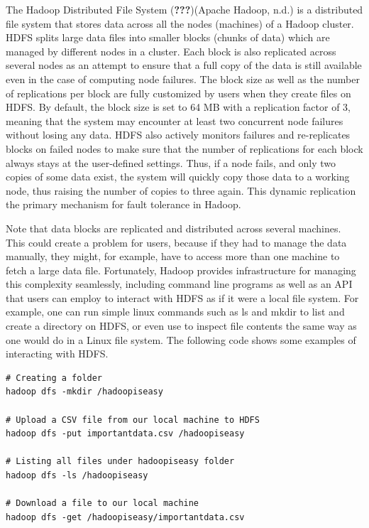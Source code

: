 \documentclass[]{krantz}
\begin{document}
The Hadoop Distributed File System ({\textbf{???}})(Apache Hadoop, n.d.)
is a distributed file system that stores data across all the nodes
(machines) of a Hadoop cluster. HDFS splits large data files into
smaller blocks (chunks of data) which are managed by different nodes in
a cluster. Each block is also replicated across several nodes as an
attempt to ensure that a full copy of the data is still available even
in the case of computing node failures. The block size as well as the
number of replications per block are fully customized by users when they
create files on HDFS. By default, the block size is set to 64 MB with a
replication factor of 3, meaning that the system may encounter at least
two concurrent node failures without losing any data. HDFS also actively
monitors failures and re-replicates blocks on failed nodes to make sure
that the number of replications for each block always stays at the
user-defined settings. Thus, if a node fails, and only two copies of
some data exist, the system will quickly copy those data to a working
node, thus raising the number of copies to three again. This dynamic
replication the primary mechanism for fault tolerance in Hadoop.

Note that data blocks are replicated and distributed across several
machines. This could create a problem for users, because if they had to
manage the data manually, they might, for example, have to access more
than one machine to fetch a large data file. Fortunately, Hadoop
provides infrastructure for managing this complexity seamlessly,
including command line programs as well as an API that users can employ
to interact with HDFS as if it were a local file system. For example,
one can run simple linux commands such as ls and mkdir to list and
create a directory on HDFS, or even use to inspect file contents the
same way as one would do in a Linux file system. The following code
shows some examples of interacting with HDFS.

\hypertarget{lst:hdfs}{\label{lst:hdfs}}
\begin{verbatim}
# Creating a folder
hadoop dfs -mkdir /hadoopiseasy

# Upload a CSV file from our local machine to HDFS
hadoop dfs -put importantdata.csv /hadoopiseasy

# Listing all files under hadoopiseasy folder
hadoop dfs -ls /hadoopiseasy

# Download a file to our local machine
hadoop dfs -get /hadoopiseasy/importantdata.csv
\end{verbatim}
\end{document}
